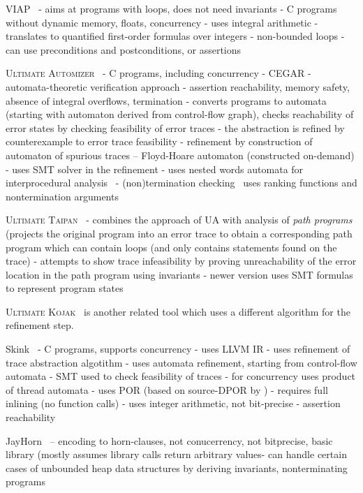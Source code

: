VIAP~
- aims at programs with loops, does not need invariants
- C programs without dynamic memory, floats, concurrency
- uses integral arithmetic
- translates to quantified first-order formulas over integers
- non-bounded loops
- can use preconditions and postconditions, or assertions

\textsc{Ultimate Automizer}~
- C programs, including concurrency
- CEGAR
- automata-theoretic verification approach
- assertion reachability, memory safety, absence of integral overflows, termination
- converts programs to automata (starting with automaton derived from control-flow graph), checks reachability of error states by checking feasibility of error traces
  - the abstraction is refined by counterexample to error trace feasibility
  - refinement by construction of automaton of spurious traces -- Floyd-Hoare automaton (constructed on-demand)
  - uses SMT solver in the refinement
- uses nested words automata for interprocedural analysis~\cite{TODO}
- (non)termination checking~ uses ranking functions and nontermination arguments

\textsc{Ultimate Taipan}~
- combines the approach of UA with analysis of \emph{path programs} (projects the original program into an error trace to obtain a corresponding path program which can contain loops (and only contains statements found on the trace)
- attempts to show trace infeasibility by proving unreachability of the error location in the path program using invariants
- newer version uses SMT formulas to represent program states

\textsc{Ultimate Kojak}~ is another related tool which uses a different algorithm for the refinement step.

Skink~
- C programs, supports concurrency
- uses LLVM IR
- uses refinement of trace abstraction algotithm 
  - uses automata refinement, starting from control-flow automata
  - SMT used to check feasibility of traces
  - for concurrency uses product of thread automata
    - uses POR (based on source-DPOR by )
- requires full inlining (no function calls)
- uses integer arithmetic, not bit-precise
- assertion reachability

JayHorn~
-- encoding to horn-clauses, not conucerrency, not bitprecise, basic library (mostly assumes library calls return arbitrary values- can handle certain cases of unbounded heap data structures by deriving invariants, nonterminating programs

